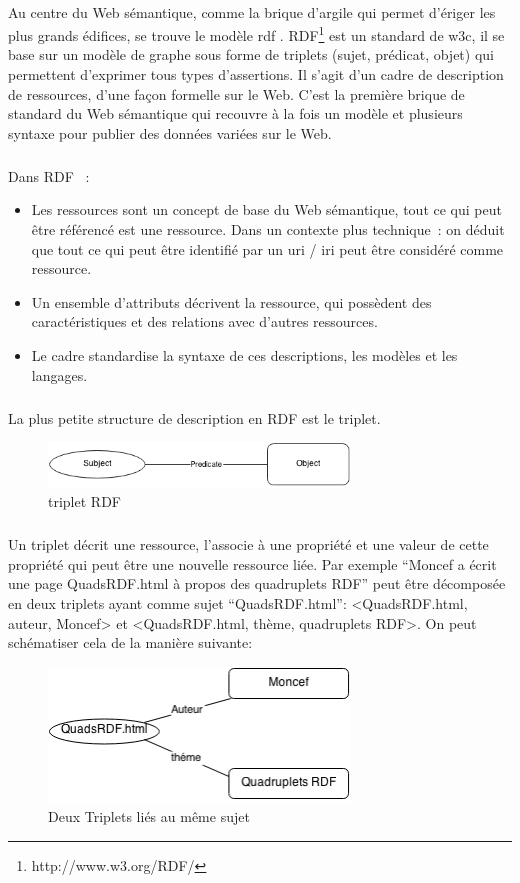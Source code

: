 \documentclass[12pt,a4	]{report}
\begin{document}
\paragraph{}
Au centre du Web sémantique, comme la brique d’argile qui permet d’ériger les plus grands édifices, se trouve le modèle \gls{rdf} . RDF\footnote{http://www.w3.org/RDF/} est un standard de \gls{w3c}, il se base sur un modèle de graphe sous forme de triplets (sujet, prédicat, objet) qui permettent d'exprimer tous types d'assertions. Il s’agit d’un cadre de description de ressources, d’une façon formelle sur le Web.
C’est la première brique de standard du Web sémantique qui recouvre à la fois un modèle et plusieurs syntaxe pour publier des données variées sur le Web.
\subparagraph{}
Dans RDF ~: 
\newline 
\begin{itemize}
\item Les ressources sont un concept de base du Web sémantique, tout ce qui peut être référencé est une ressource. Dans un contexte plus technique~: on déduit que tout ce qui peut être identifié par un \gls{uri} / \gls{iri} peut être considéré comme ressource.
\item  Un ensemble d’attributs décrivent la ressource, qui possèdent des caractéristiques et des relations avec d’autres ressources.
\item Le cadre standardise la syntaxe de ces descriptions, les modèles et les langages.  
\end{itemize}
\subparagraph{}
La plus petite structure de description en RDF est le triplet.
\begin{figure}[H]
        \centering
                \centering
                \includegraphics[width=8cm]{tripletrdf.png}
               \caption{triplet RDF}

\end{figure}
\subparagraph{}
Un triplet décrit une ressource, l’associe à une propriété et une valeur de cette propriété qui peut être une nouvelle ressource liée.
\newline
Par exemple “Moncef a écrit une page QuadsRDF.html à propos des quadruplets RDF” peut être décomposée en deux triplets ayant comme sujet “QuadsRDF.html”: <QuadsRDF.html, auteur, Moncef> et <QuadsRDF.html, thème, quadruplets RDF>.
\newline
On peut schématiser cela de la manière suivante:
\begin{figure}[H]
        \centering
                \centering
                \includegraphics[width=8cm]{Diag.png}
               \caption{Deux Triplets liés au même sujet}

\end{figure}
\end{document}
